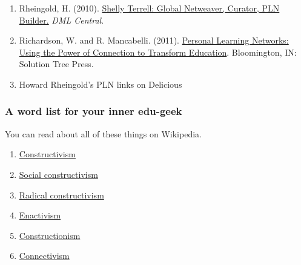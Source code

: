 \begin{enumerate}
\item
  Rheingold, H. (2010).
  \href{http://dmlcentral.net/blog/howard-rheingold/shelly-terrell-global-netweaver-curator-pln-builder}{Shelly
  Terrell: Global Netweaver, Curator, PLN Builder.} \emph{DML
  Central}.
\item
  Richardson, W. and R. Mancabelli. (2011).
  \href{http://www.amazon.com/Personal-Learning-Networks-Connections-Transform/dp/193554327X}{Personal
  Learning Networks: Using the Power of Connection to Transform
  Education}. Bloomington, IN: Solution Tree Press.
\item
  Howard Rheingold's PLN links on Delicious
\end{enumerate}
\subsubsection{A word list for your inner edu-geek}

You can read about all of these things on Wikipedia.

\begin{enumerate}
\item
  \href{http://en.wikipedia.org/wiki/Constructivism\_(philosophy\_of\_education)}{Constructivism}
\item
  \href{http://en.wikipedia.org/wiki/Social\_constructivism}{Social
  constructivism}
\item
  \href{http://www.english.iup.edu/mmwimson/Syllabi/803/721/Radical\%20Constructivism\%20\%20\%20721.htm}{Radical
  constructivism}
\item
  \href{http://en.wikipedia.org/wiki/Enactivism\_(psychology)}{Enactivism}
\item
  \href{http://en.wikipedia.org/wiki/Constructionism\_(learning\_theory)}{Constructionism}
\item
  \href{http://en.wikipedia.org/wiki/Connectivism}{Connectivism}
\end{enumerate}
